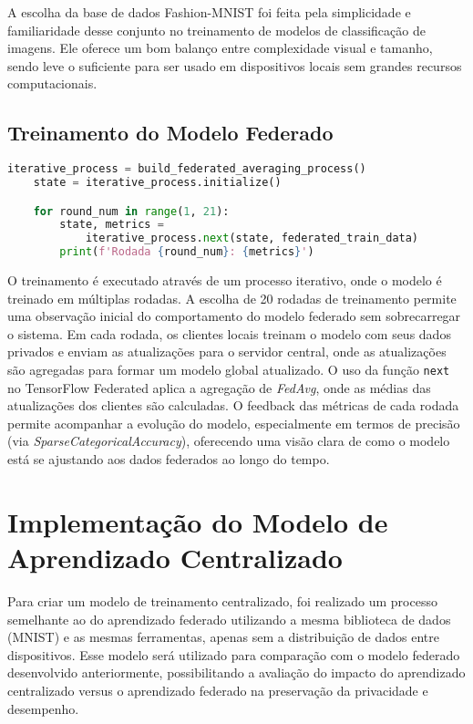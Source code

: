 A escolha da base de dados Fashion-MNIST foi feita pela simplicidade e familiaridade desse conjunto no treinamento de modelos de classificação de imagens. Ele oferece um bom balanço entre complexidade visual e tamanho, sendo leve o suficiente para ser usado em dispositivos locais sem grandes recursos computacionais.

\subsection{Treinamento do Modelo Federado}

\begin{lstlisting}[language=Python, caption={Treinamento do modelo federado}, label={lst:federated_training}]
    iterative_process = build_federated_averaging_process()
    state = iterative_process.initialize()

    for round_num in range(1, 21):
        state, metrics = 
            iterative_process.next(state, federated_train_data)
        print(f'Rodada {round_num}: {metrics}')
\end{lstlisting}

O treinamento é executado através de um processo iterativo, onde o modelo é treinado em múltiplas rodadas. A escolha de 20 rodadas de treinamento permite uma observação inicial do comportamento do modelo federado sem sobrecarregar o sistema. Em cada rodada, os clientes locais treinam o modelo com seus dados privados e enviam as atualizações para o servidor central, onde as atualizações são agregadas para formar um modelo global atualizado. O uso da função \texttt{next} no TensorFlow Federated aplica a agregação de \textit{FedAvg}, onde as médias das atualizações dos clientes são calculadas. O feedback das métricas de cada rodada permite acompanhar a evolução do modelo, especialmente em termos de precisão (via \textit{SparseCategoricalAccuracy}), oferecendo uma visão clara de como o modelo está se ajustando aos dados federados ao longo do tempo.

\section{Implementação do Modelo de Aprendizado Centralizado}

Para criar um modelo de treinamento centralizado, foi realizado um processo semelhante ao do aprendizado federado utilizando a mesma biblioteca de dados (MNIST) e as mesmas ferramentas, apenas sem a distribuição de dados entre dispositivos. Esse modelo será utilizado para comparação com o modelo federado desenvolvido anteriormente, possibilitando a avaliação do impacto do aprendizado centralizado versus o aprendizado federado na preservação da privacidade e desempenho.

